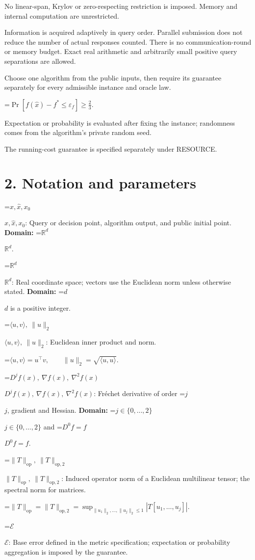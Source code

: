 \documentclass[10pt,a4paper]{article}
\newcommand{\AtlasMath}[1]{\par\begingroup\centering\setbox0=\hbox{$\displaystyle #1$}\ifdim\wd0>1.4\linewidth\typeout{ATLAS WIDE FORMULA: \the\wd0}\fi\ifdim\wd0>\linewidth\resizebox{\linewidth}{!}{\box0}\else\box0\fi\par\endgroup}
\newcommand{\AtlasInlineMath}[1]{\begingroup\setbox0=\hbox{$#1$}\ifdim\wd0>.4\linewidth\endgroup\AtlasMath{#1}\else\endgroup$#1$\fi}
\begin{document}
No linear-span, Krylov or zero-respecting restriction is imposed. Memory and internal computation are unrestricted.

Information is acquired adaptively in query order. Parallel submission does not reduce the number of actual responses counted. There is no communication-round or memory budget. Exact real arithmetic and arbitrarily small positive query separations are allowed.

Choose one algorithm from the public inputs, then require its guarantee separately for every admissible instance and oracle law.


\AtlasMath{\Pr\!\left[f(\widehat{x})-f^*\le \varepsilon_f\right]\ge\frac23.}


Expectation or probability is evaluated after fixing the instance; randomness comes from the algorithm's private random seed.

The running-cost guarantee is specified separately under RESOURCE.

\section{2. Notation and parameters}
\AtlasInlineMath{x,\widehat{x},x_0}: Query or decision point, algorithm output, and public initial point. \textbf{Domain:} \AtlasInlineMath{\mathbb{R}^d}.

\AtlasInlineMath{\mathbb{R}^d}: Real coordinate space; vectors use the Euclidean norm unless otherwise stated. \textbf{Domain:} \AtlasInlineMath{d} is a positive integer.

\AtlasInlineMath{\langle u,v\rangle,\ \|u\|_2}: Euclidean inner product and norm.


\AtlasMath{\langle u,v\rangle=u^\top v,\qquad\|u\|_2=\sqrt{\langle u,u\rangle}.}


\AtlasInlineMath{D^jf(x),\ \nabla f(x),\ \nabla^2f(x)}: Fréchet derivative of order \AtlasInlineMath{j}, gradient and Hessian. \textbf{Domain:} \AtlasInlineMath{j\in\{0,\ldots,2\}} and \AtlasInlineMath{D^0f=f}.

\AtlasInlineMath{\|T\|_{\mathrm{op}},\ \|T\|_{\mathrm{op},2}}: Induced operator norm of a Euclidean multilinear tensor; the spectral norm for matrices.


\AtlasMath{\|T\|_{\mathrm{op}}=\|T\|_{\mathrm{op},2}=\sup_{\|u_1\|_2,\ldots,\|u_j\|_2\le1}|T[u_1,\ldots,u_j]|.}


\AtlasInlineMath{\mathcal{E}}: Base error defined in the metric specification; expectation or probability aggregation is imposed by the guarantee.
\end{document}
